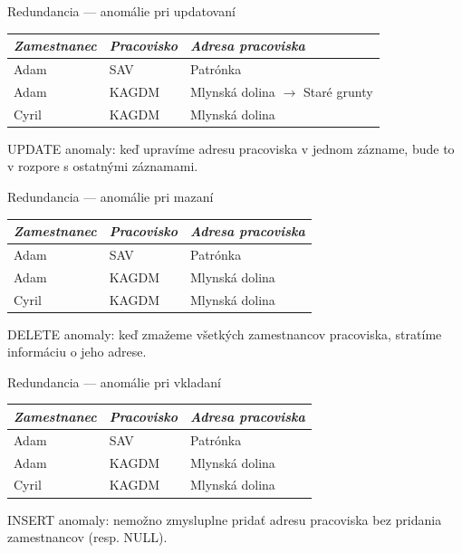 \documentclass[12pt]{beamer}
\begin{document}
\begin{frame}[fragile]{Redundancia --- anomálie pri updatovaní}
\begin{tabular}{|l|l|l|}
\hline
\emph{Zamestnanec} & \emph{Pracovisko} & \emph{Adresa pracoviska} \\\hline
Adam & SAV & Patrónka \\\hline
Adam & KAGDM & Mlynská dolina \alert{$\rightarrow$ Staré grunty}\\\hline
Cyril & KAGDM & Mlynská dolina \\\hline
\end{tabular}
\bigskip

\alert{UPDATE anomaly}: keď upravíme adresu pracoviska v jednom zázname, bude to v rozpore s ostatnými záznamami.
\end{frame}

\begin{frame}[fragile]{Redundancia --- anomálie pri mazaní}
\begin{tabular}{|l|l|l|}
\hline
\emph{Zamestnanec} & \emph{Pracovisko} & \emph{Adresa pracoviska} \\\hline
Adam & SAV & Patrónka \\\hline
Adam & KAGDM & Mlynská dolina \\\hline
Cyril & KAGDM & Mlynská dolina \\\hline
\end{tabular}
\bigskip

\alert{DELETE anomaly}: keď zmažeme všetkých zamestnancov pracoviska, stratíme informáciu o jeho adrese.
\end{frame}

\begin{frame}[fragile]{Redundancia --- anomálie pri vkladaní}
\begin{tabular}{|l|l|l|}
\hline
\emph{Zamestnanec} & \emph{Pracovisko} & \emph{Adresa pracoviska} \\\hline
Adam & SAV & Patrónka \\\hline
Adam & KAGDM & Mlynská dolina \\\hline
Cyril & KAGDM & Mlynská dolina \\\hline
\end{tabular}
\bigskip

\alert{INSERT anomaly}: nemožno zmysluplne pridať adresu pracoviska bez pridania zamestnancov (resp. NULL).
\end{frame}
\end{document}
